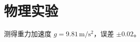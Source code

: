 \documentclass{ctexart}
\begin{document}
\section{物理实验}
测得重力加速度 $g = 9.81 \, \mathrm{m/s^2}$，误差 $\pm 0.02$。\cite{kohnen2019}
\end{document}
